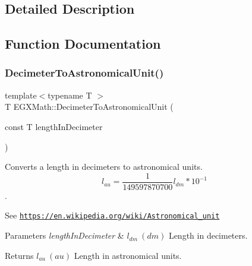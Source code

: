 \subsection{Detailed Description}


\subsection{Function Documentation}
\mbox{\label{group___e_g_x_math-_conversions-_length_conversions-_s_i-_decimeter-_astronomical_ga9cf39545f022d3a541668e644347b2f8}} 
\subsubsection{\texorpdfstring{Decimeter\+To\+Astronomical\+Unit()}{DecimeterToAstronomicalUnit()}}
{\footnotesize\ttfamily template$<$typename T $>$ \\
T E\+G\+X\+Math\+::\+Decimeter\+To\+Astronomical\+Unit (\begin{DoxyParamCaption}\item[{const T}]{length\+In\+Decimeter }\end{DoxyParamCaption})}



Converts a length in decimeters to astronomical units. \[ l_{au}= \frac{1}{149597870700} l_{dm} * 10^{-1} \]. 

See \href{https://en.wikipedia.org/wiki/Astronomical_unit}{\tt https\+://en.\+wikipedia.\+org/wiki/\+Astronomical\+\_\+unit} 
\begin{DoxyParams}{Parameters}
{\em length\+In\+Decimeter} & $ l_{dm}\ (dm)$ Length in decimeters. \\
\hline
\end{DoxyParams}
\begin{DoxyReturn}{Returns}
$ l_{au}\ (au)$ Length in astronomical units. 
\end{DoxyReturn}
\mbox{\label{group___e_g_x_math-_conversions-_length_conversions-_s_i-_decimeter-_astronomical_ga2dedea5304a0dbcba4efa1128eda42d2}} 
